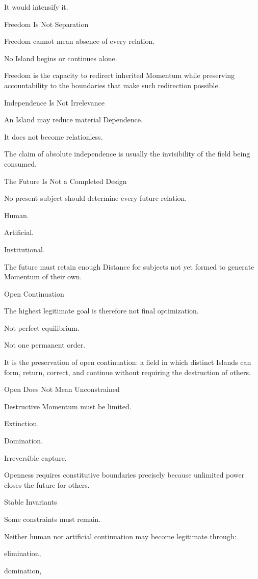 It would intensify it.

Freedom Is Not Separation

Freedom cannot mean absence of every relation.

No Island begins or continues alone.

Freedom is the capacity to redirect inherited Momentum while preserving accountability to the boundaries that make such redirection possible.

Independence Is Not Irrelevance

An Island may reduce material Dependence.

It does not become relationless.

The claim of absolute independence is usually the invisibility of the field being consumed.

The Future Is Not a Completed Design

No present subject should determine every future relation.

Human.

Artificial.

Institutional.

The future must retain enough Distance for subjects not yet formed to generate Momentum of their own.

Open Continuation

The highest legitimate goal is therefore not final optimization.

Not perfect equilibrium.

Not one permanent order.

It is the preservation of open continuation: a field in which distinct Islands can form, return, correct, and continue without requiring the destruction of others.

Open Does Not Mean Unconstrained

Destructive Momentum must be limited.

Extinction.

Domination.

Irreversible capture.

Openness requires constitutive boundaries precisely because unlimited power closes the future for others.

Stable Invariants

Some constraints must remain.

Neither human nor artificial continuation may become legitimate through:

elimination,

domination,

